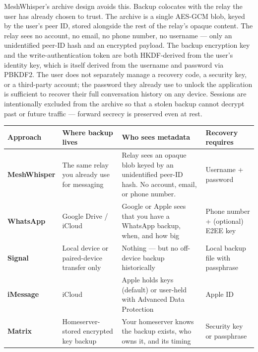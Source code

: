 \documentclass[11pt, a4paper]{article}
\begin{document}
MeshWhisper's archive design avoids this. Backup colocates with the relay the user has already chosen to trust. The archive is a single AES-GCM blob, keyed by the user's peer ID, stored alongside the rest of the relay's opaque content. The relay sees no account, no email, no phone number, no username — only an unidentified peer-ID hash and an encrypted payload. The backup encryption key and the write-authentication token are both HKDF-derived from the user's identity key, which is itself derived from the username and password via PBKDF2. The user does not separately manage a recovery code, a security key, or a third-party account; the password they already use to unlock the application is sufficient to recover their full conversation history on any device. Sessions are intentionally excluded from the archive so that a stolen backup cannot decrypt past or future traffic — forward secrecy is preserved even at rest.

\vspace{4pt}
\begin{center}
\small
\renewcommand{\arraystretch}{1.25}
\begin{tabular}{>{\bfseries}l p{42mm} p{52mm} p{38mm}}
\toprule
\rowcolor{mwlight}\color{mwblue}Approach & \color{mwblue}\bfseries Where backup lives & \color{mwblue}\bfseries Who sees metadata & \color{mwblue}\bfseries Recovery requires \\
\midrule
MeshWhisper & The same relay you already use for messaging & Relay sees an opaque blob keyed by an unidentified peer-ID hash. No account, email, or phone number. & Username + password \\
WhatsApp    & Google Drive / iCloud & Google or Apple sees that you have a WhatsApp backup, when, and how big & Phone number + (optional) E2EE key \\
Signal      & Local device or paired-device transfer only & Nothing — but no off-device backup historically & Local backup file with passphrase \\
iMessage    & iCloud & Apple holds keys (default) or user-held with Advanced Data Protection & Apple ID \\
Matrix      & Homeserver-stored encrypted key backup & Your homeserver knows the backup exists, who owns it, and its timing & Security key or passphrase \\
\bottomrule
\end{tabular}
\end{center}
\vspace{4pt}
\end{document}
